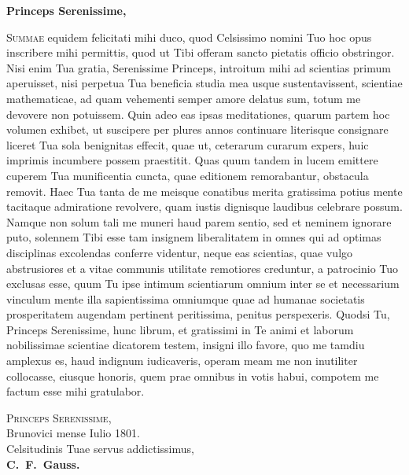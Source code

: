 \documentclass[12pt,a4paper]{article}
\theoremstyle{plain}
\theoremstyle{definition}
\theoremstyle{remark}
\begin{document}
\noindent\textbf{Princeps Serenissime,}

\vspace{0.5em}
\lettrine[lines=3]{S}{ummae} equidem felicitati mihi duco, quod Celsissimo nomini Tuo hoc opus inscribere mihi permittis, quod ut Tibi offeram sancto pietatis officio obstringor. Nisi enim Tua gratia, Serenissime Princeps, introitum mihi ad scientias primum aperuisset, nisi perpetua Tua beneficia studia mea usque sustentavissent, scientiae mathematicae, ad quam vehementi semper amore delatus sum, totum me devovere non potuissem. Quin adeo eas ipsas meditationes, quarum partem hoc volumen exhibet, ut suscipere per plures annos continuare literisque consignare liceret Tua sola benignitas effecit, quae ut, ceterarum curarum expers, huic imprimis incumbere possem praestitit. Quas quum tandem in lucem emittere cuperem Tua munificentia cuncta, quae editionem remorabantur, obstacula removit. Haec Tua tanta de me meisque conatibus merita gratissima potius mente tacitaque admiratione revolvere, quam iustis dignisque laudibus celebrare possum. Namque non solum tali me muneri haud parem sentio, sed et neminem ignorare puto, solennem Tibi esse tam insignem liberalitatem in omnes qui ad optimas disciplinas excolendas conferre videntur, neque eas scientias, quae vulgo abstrusiores et a vitae communis utilitate remotiores creduntur, a patrocinio Tuo exclusas esse, quum Tu ipse intimum scientiarum omnium inter se et necessarium vinculum mente illa sapientissima omniumque quae ad humanae societatis prosperitatem augendam pertinent peritissima, penitus perspexeris. Quodsi Tu, Princeps Serenissime, hunc librum, et gratissimi in Te animi et laborum nobilissimae scientiae dicatorem testem, insigni illo favore, quo me tamdiu amplexus es, haud indignum iudicaveris, operam meam me non inutiliter collocasse, eiusque honoris, quem prae omnibus in votis habui, compotem me factum esse mihi gratulabor.

\vspace{2em}
\begin{flushright}
\begin{minipage}{0.7\textwidth}
\begin{flushright}
\textsc{Princeps Serenissime,}\\[0.3em]
Brunovici mense Iulio 1801.\\[0.5em]
Celsitudinis Tuae servus addictissimus,\\[0.3em]
\textbf{C.~F.~Gauss.}
\end{flushright}
\end{minipage}
\end{flushright}
\clearpage
\end{document}
